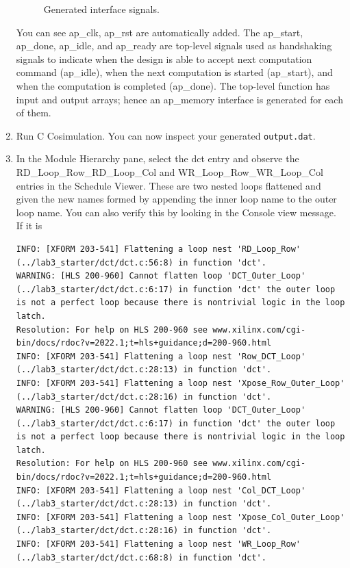 \documentclass[a4paper,12pt,twoside]{article}
\begin{document}
\begin{enumerate}
\begin{figure}[H]
        \caption{Generated interface signals.}
    \end{figure}
    You can see ap\_clk, ap\_rst are automatically added. The ap\_start, ap\_done, ap\_idle, and ap\_ready are top-level signals used as handshaking signals to indicate when the design is able to accept next computation command (ap\_idle), when the next computation is started (ap\_start), and when the computation is completed (ap\_done). The top-level function has input and output arrays; hence an ap\_memory interface is generated for each of them.
    \item Run C Cosimulation. You can now inspect your generated \texttt{output.dat}.
    \item In the Module Hierarchy pane, select the dct entry and observe the\\
    RD\_Loop\_Row\_RD\_Loop\_Col and WR\_Loop\_Row\_WR\_Loop\_Col entries in the Schedule Viewer. These are two nested loops flattened and given the new names formed by appending the inner loop name to the outer loop name. You can also verify this by looking in the Console view message. If it is
    \begin{verbatim}
INFO: [XFORM 203-541] Flattening a loop nest 'RD_Loop_Row' (../lab3_starter/dct/dct.c:56:8) in function 'dct'.
WARNING: [HLS 200-960] Cannot flatten loop 'DCT_Outer_Loop' (../lab3_starter/dct/dct.c:6:17) in function 'dct' the outer loop is not a perfect loop because there is nontrivial logic in the loop latch.
Resolution: For help on HLS 200-960 see www.xilinx.com/cgi-bin/docs/rdoc?v=2022.1;t=hls+guidance;d=200-960.html
INFO: [XFORM 203-541] Flattening a loop nest 'Row_DCT_Loop' (../lab3_starter/dct/dct.c:28:13) in function 'dct'.
INFO: [XFORM 203-541] Flattening a loop nest 'Xpose_Row_Outer_Loop' (../lab3_starter/dct/dct.c:28:16) in function 'dct'.
WARNING: [HLS 200-960] Cannot flatten loop 'DCT_Outer_Loop' (../lab3_starter/dct/dct.c:6:17) in function 'dct' the outer loop is not a perfect loop because there is nontrivial logic in the loop latch.
Resolution: For help on HLS 200-960 see www.xilinx.com/cgi-bin/docs/rdoc?v=2022.1;t=hls+guidance;d=200-960.html
INFO: [XFORM 203-541] Flattening a loop nest 'Col_DCT_Loop' (../lab3_starter/dct/dct.c:28:13) in function 'dct'.
INFO: [XFORM 203-541] Flattening a loop nest 'Xpose_Col_Outer_Loop' (../lab3_starter/dct/dct.c:28:16) in function 'dct'.
INFO: [XFORM 203-541] Flattening a loop nest 'WR_Loop_Row' (../lab3_starter/dct/dct.c:68:8) in function 'dct'.
    \end{verbatim}

\end{enumerate}
\end{document}
